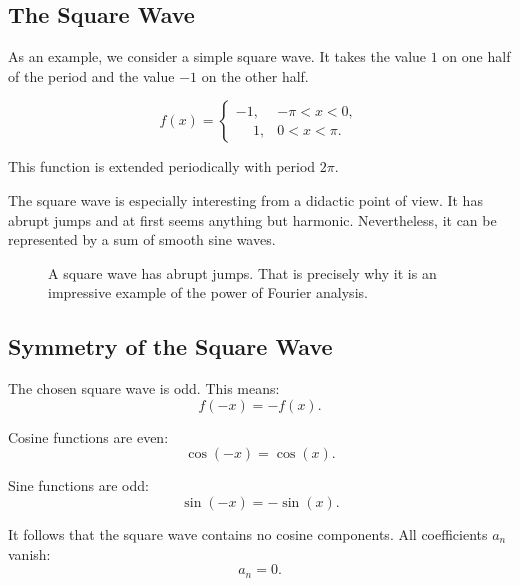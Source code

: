 \subsection{The Square Wave}

As an example, we consider a simple square wave.
It takes the value \(1\) on one half of the period and the value \(-1\) on the other half.

\[
f(x)=
\begin{cases}
	-1, & -\pi < x < 0,\\
	\phantom{-}1, & 0 < x < \pi.
\end{cases}
\]

This function is extended periodically with period \(2\pi\).

The square wave is especially interesting from a didactic point of view.
It has abrupt jumps and at first seems anything but harmonic.
Nevertheless, it can be represented by a sum of smooth sine waves.
\FloatBarrier
\begin{figure}[H]
	\centering
	\caption{A square wave has abrupt jumps.
		That is precisely why it is an impressive example of the power of Fourier analysis.}
	\label{fig:rechtecksignal}
\end{figure}

\subsection{Symmetry of the Square Wave}

The chosen square wave is odd.
This means:
\[
f(-x)=-f(x).
\]

Cosine functions are even:
\[
\cos(-x)=\cos(x).
\]

Sine functions are odd:
\[
\sin(-x)=-\sin(x).
\]

It follows that
the square wave contains no cosine components.
All coefficients \(a_n\) vanish:
\[
a_n=0.
\]

